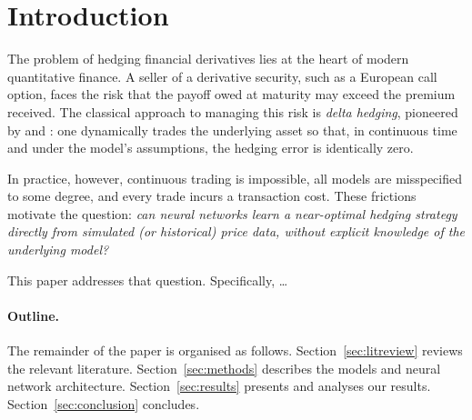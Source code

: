 %

\section{Introduction}
\label{sec:introduction}

The problem of hedging financial derivatives lies at the heart of modern quantitative
finance. A seller of a derivative security, such as a European call option, faces the
risk that the payoff owed at maturity may exceed the premium received. The classical
approach to managing this risk is \emph{delta hedging}, pioneered by
\citet{BlackScholes1973} and \citet{Merton1973}: one dynamically trades the underlying
asset so that, in continuous time and under the model's assumptions, the hedging error
is identically zero.

In practice, however, continuous trading is impossible, all models are misspecified to
some degree, and every trade incurs a transaction cost. These frictions motivate the
question: \emph{can neural networks learn a near-optimal hedging strategy directly from
simulated (or historical) price data, without explicit knowledge of the underlying
model?}

This paper addresses that question. Specifically, \ldots


\paragraph{Outline.} The remainder of the paper is organised as follows.
Section~\ref{sec:litreview} reviews the relevant literature.
Section~\ref{sec:methods} describes the models and neural network architecture.
Section~\ref{sec:results} presents and analyses our results.
Section~\ref{sec:conclusion} concludes.
